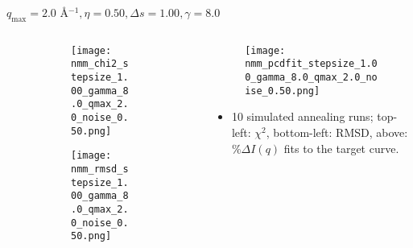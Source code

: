 \documentclass{beamer}
\begin{document}
\begin{frame}{$ q_{\textrm{max}}=2.0 $ \AA $^{-1}, \eta=0.50, \Delta s=1.00, \gamma=8.0$}
	\begin{columns}
		\begin{column}{.5\textwidth}
			\begin{figure}[H]
			\centering
			\begin{subfigure}[b]{\textwidth}
				\centering
				\texttt{[image: nmm\_chi2\_stepsize\_1.00\_gamma\_8.0\_qmax\_2.0\_noise\_0.50.png]}
				\label{fig:}
			\end{subfigure}
			\begin{subfigure}[b]{\textwidth}
				\centering
				\texttt{[image: nmm\_rmsd\_stepsize\_1.00\_gamma\_8.0\_qmax\_2.0\_noise\_0.50.png]}
				\label{fig:}
			\end{subfigure}
			\end{figure}
		\end{column}
		\begin{column}{.5\textwidth}
			\begin{figure}[H]
				\centering
				\texttt{[image: nmm\_pcdfit\_stepsize\_1.00\_gamma\_8.0\_qmax\_2.0\_noise\_0.50.png]}
				\label{fig:}
			\end{figure}
			\begin{itemize}
				\item 10 simulated annealing runs; top-left: $\chi^2$, bottom-left: RMSD, above: $\%\Delta I(q)$ fits to the target curve.
			\end{itemize}
		\end{column}
	\end{columns}
\end{frame}
 
\end{document}
